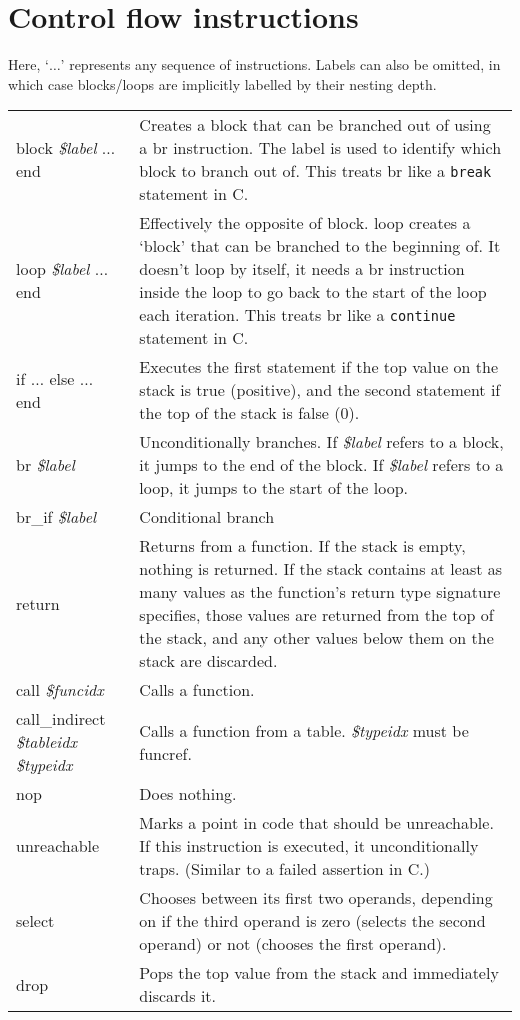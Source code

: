 \documentclass[10pt,a4paper]{article}
\begin{document}
\section*{Control flow instructions}

Here, `$\ldots$' represents any sequence of instructions. Labels can also be omitted, in which case blocks/loops are implicitly labelled by their nesting depth.


\begin{xltabular}{\textwidth}{>{\sffamily}lX}
\toprule
block \normalfont\textit{\$label} $\ldots$ end & Creates a block that can be branched out of using a \textsf{br} instruction. The label is used to identify which block to branch out of. This treats \textsf{br} like a \texttt{break} statement in C. \\
loop \normalfont\textit{\$label} $\ldots$ end & Effectively the opposite of \textsf{block}. \textsf{loop} creates a `block' that can be branched to the beginning of. It doesn't loop by itself, it needs a \textsf{br} instruction inside the loop to go back to the start of the loop each iteration. This treats \textsf{br} like a \texttt{continue} statement in C. \\
if $\ldots$ else $\ldots$ end & Executes the first statement if the top value on the stack is true (positive), and the second statement if the top of the stack is false (0). \\
br \normalfont\textit{\$label} & Unconditionally branches. If \textit{\$label} refers to a block, it jumps to the end of the block. If \textit{\$label} refers to a loop, it jumps to the start of the loop. \\
br\_if \normalfont\textit{\$label} & Conditional branch \\
return & Returns from a function. If the stack is empty, nothing is returned. If the stack contains at least as many values as the function's return type signature specifies, those values are returned from the top of the stack, and any other values below them on the stack are discarded. \\
call \normalfont\textit{\$funcidx} & Calls a function. \\
call\_indirect \normalfont\textit{\$tableidx \$typeidx} & Calls a function from a table. \textit{\$typeidx} must be \textsf{funcref}. \\
nop & Does nothing. \\
unreachable & Marks a point in code that should be unreachable. If this instruction is executed, it unconditionally traps. (Similar to a failed assertion in C.) \\
select & Chooses between its first two operands, depending on if the third operand is zero (selects the second operand) or not (chooses the first operand). \\
drop & Pops the top value from the stack and immediately discards it. \\
\bottomrule
\end{xltabular}
\end{document}

